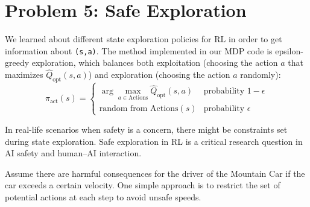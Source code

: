 \documentclass{article}
\theoremstyle{case}
\theoremstyle{definition}
\begin{document}
\newpage

\section*{Problem 5: Safe Exploration}

We learned about different state exploration policies for RL in order to get information about \texttt{(s,a)}.
The method implemented in our MDP code is epsilon-greedy exploration, which balances both exploitation (choosing the action $a$ that
maximizes $\hat{Q}_{\text{opt}}(s, a)$) and exploration (choosing the action $a$ randomly):
$$\pi_{\text{act}}(s) = \begin{cases} \arg\max_{a \in \text{Actions}}\hat{Q}_{\text{opt}}(s,a) & \text{probability } 1 - \epsilon \\
\text{random from Actions}(s) & \text{probability } \epsilon \end{cases}$$

In real-life scenarios when safety is a concern, there might be constraints set during state exploration.
Safe exploration in RL is a critical research question in AI safety and human–AI interaction.

Assume there are harmful consequences for the driver of the Mountain Car if the car exceeds a certain velocity.
One simple approach is to restrict the set of potential actions at each step to avoid unsafe speeds.
\end{document}

